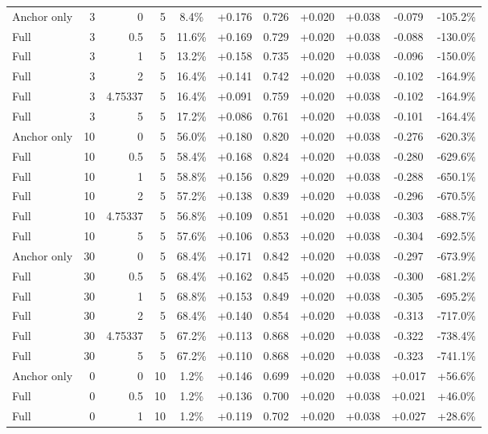 \begin{table}[htbp]
\begin{tabular}{lrrrccccccc}
Anchor only & 3 & 0 & 5 & 8.4\% & +0.176 & 0.726 & +0.020 & +0.038 & -0.079 & -105.2\% \\
Full & 3 & 0.5 & 5 & 11.6\% & +0.169 & 0.729 & +0.020 & +0.038 & -0.088 & -130.0\% \\
Full & 3 & 1 & 5 & 13.2\% & +0.158 & 0.735 & +0.020 & +0.038 & -0.096 & -150.0\% \\
Full & 3 & 2 & 5 & 16.4\% & +0.141 & 0.742 & +0.020 & +0.038 & -0.102 & -164.9\% \\
Full & 3 & 4.75337 & 5 & 16.4\% & +0.091 & 0.759 & +0.020 & +0.038 & -0.102 & -164.9\% \\
Full & 3 & 5 & 5 & 17.2\% & +0.086 & 0.761 & +0.020 & +0.038 & -0.101 & -164.4\% \\
Anchor only & 10 & 0 & 5 & 56.0\% & +0.180 & 0.820 & +0.020 & +0.038 & -0.276 & -620.3\% \\
Full & 10 & 0.5 & 5 & 58.4\% & +0.168 & 0.824 & +0.020 & +0.038 & -0.280 & -629.6\% \\
Full & 10 & 1 & 5 & 58.8\% & +0.156 & 0.829 & +0.020 & +0.038 & -0.288 & -650.1\% \\
Full & 10 & 2 & 5 & 57.2\% & +0.138 & 0.839 & +0.020 & +0.038 & -0.296 & -670.5\% \\
Full & 10 & 4.75337 & 5 & 56.8\% & +0.109 & 0.851 & +0.020 & +0.038 & -0.303 & -688.7\% \\
Full & 10 & 5 & 5 & 57.6\% & +0.106 & 0.853 & +0.020 & +0.038 & -0.304 & -692.5\% \\
Anchor only & 30 & 0 & 5 & 68.4\% & +0.171 & 0.842 & +0.020 & +0.038 & -0.297 & -673.9\% \\
Full & 30 & 0.5 & 5 & 68.4\% & +0.162 & 0.845 & +0.020 & +0.038 & -0.300 & -681.2\% \\
Full & 30 & 1 & 5 & 68.8\% & +0.153 & 0.849 & +0.020 & +0.038 & -0.305 & -695.2\% \\
Full & 30 & 2 & 5 & 68.4\% & +0.140 & 0.854 & +0.020 & +0.038 & -0.313 & -717.0\% \\
Full & 30 & 4.75337 & 5 & 67.2\% & +0.113 & 0.868 & +0.020 & +0.038 & -0.322 & -738.4\% \\
Full & 30 & 5 & 5 & 67.2\% & +0.110 & 0.868 & +0.020 & +0.038 & -0.323 & -741.1\% \\
Anchor only & 0 & 0 & 10 & 1.2\% & +0.146 & 0.699 & +0.020 & +0.038 & +0.017 & +56.6\% \\
Full & 0 & 0.5 & 10 & 1.2\% & +0.136 & 0.700 & +0.020 & +0.038 & +0.021 & +46.0\% \\
Full & 0 & 1 & 10 & 1.2\% & +0.119 & 0.702 & +0.020 & +0.038 & +0.027 & +28.6\% \\

\end{tabular}
\end{table}
